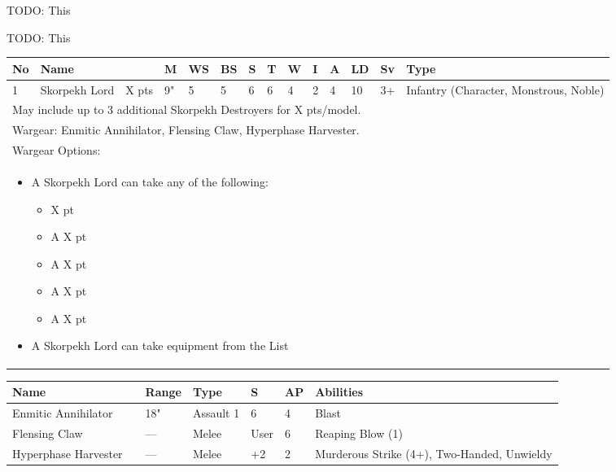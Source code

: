 
TODO: This

\newpage
{}

TODO: This

\newpage
{}

\noindent
\begin{tabular}{||m{10pt} m{95pt} m{30pt} m{11pt} m{11pt} m{11pt} m{11pt} m{11pt} m{11pt} m{11pt} m{11pt} m{11pt} m{11pt} m{125pt}||}
	\hline
	No & Name & & M & WS & BS & S & T & W & I & A & LD & Sv & Type \\
	\hline
	1 & Skorpekh Lord & X pts & 9" & 5 & 5 & 6 & 6 & 4 & 2 & 4 & 10 & 3+ & Infantry (Character, Monstrous, Noble) \\
	\hline
	\hline
	\multicolumn{14}{||Z{532 pt}||}{May include up to 3 additional Skorpekh Destroyers for X pts/model.}\\	
	\hline
	\hline
	\multicolumn{14}{||Z{532 pt}||}{Wargear: Enmitic Annihilator, Flensing Claw, Hyperphase Harvester.} \\
	\multicolumn{14}{||Z{532 pt}||}{Wargear Options:} \\	\multicolumn{14}{||Z{532 pt}||}{\begin{itemize}
			\item A Skorpekh Lord can take any of the following:
			\begin{itemize}
				\item \quickref{Mindshackle Scarabs} \hrulefill X pt
				\item A \quickref{Phase Shifter} \hrulefill X pt
				\item A \quickref{Phylactery} \hrulefill X pt
				\item A \quickref{Sempiternal Weave} \hrulefill X pt
				\item A \quickref{Shadow Ankh} \hrulefill X pt
			\end{itemize}
			\item A Skorpekh Lord can take equipment from the \quickref{Artefacts of the Aeons} List
	\end{itemize}} \\
	\hline
\end{tabular}

\noindent
\begin{tabular}{||m{110pt} m{30pt} m{31pt} m{55pt} m{12pt} m{12pt} m{210pt}||}
	\hline
	Name & & Range & Type & S & AP & Abilities \\
	\hline
	Enmitic Annihilator &  & 18" & Assault 1 & 6 & 4 & Blast \\
	Flensing Claw &  & — & Melee & User & 6 & Reaping Blow (1) \\
	Hyperphase Harvester &  & — & Melee & +2 & 2 & Murderous Strike (4+), Two-Handed, Unwieldy \\
	\hline
\end{tabular}

